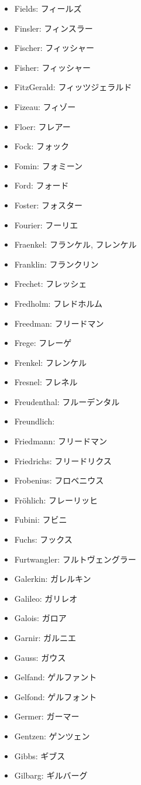 \documentclass[openany, a4paper, oneside]{jsbook}
\begin{document}
\begin{itemize}
\item Fields: フィールズ
\item Finsler: フィンスラー
\item Fischer: フィッシャー
\item Fisher: フィッシャー
\item FitzGerald: フィッツジェラルド
\item Fizeau: フィゾー
\item Floer: フレアー
\item Fock: フォック
\item Fomin: フォミーン
\item Ford: フォード
\item Foster: フォスター
\item Fourier: フーリエ
\item Fraenkel: フランケル, フレンケル
\item Franklin: フランクリン
\item Frechet: フレッシェ
\item Fredholm: フレドホルム
\item Freedman: フリードマン
\item Frege: フレーゲ
\item Frenkel: フレンケル
\item Fresnel: フレネル
\item Freudenthal: フルーデンタル
\item Freundlich:
\item Friedmann: フリードマン
\item Friedrichs: フリードリクス
\item Frobenius: フロベニウス
\item Fr\"ohlich: フレーリッヒ
\item Fubini: フビニ
\item Fuchs: フックス
\item Furtwangler: フルトヴェングラー
\item Galerkin: ガレルキン
\item Galileo: ガリレオ
\item Galois: ガロア
\item Garnir: ガルニエ
\item Gauss: ガウス
\item Gelfand: ゲルファント
\item Gelfond: ゲルフォント
\item Germer: ガーマー
\item Gentzen: ゲンツェン
\item Gibbs: ギブス
\item Gilbarg: ギルバーグ

\end{itemize}
\end{document}
